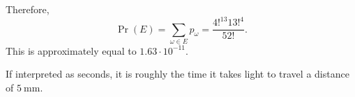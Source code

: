 \documentclass[12pt]{article}
\begin{document}
\begin{solution}
    Therefore, \[
        \Pr(E) = \sum_{\omega \in E} p_{\omega} = \frac{4!^{13} 13!^{4}}{52!}.
    \] This is approximately equal to $1.63 \cdot 10^{-11}$.
    
    If interpreted as seconds, it is roughly the time it takes light to travel a
    distance of $\SI{5}{\milli\meter}$.
\end{solution}
%     
%
%
%
%
%
\end{document}
